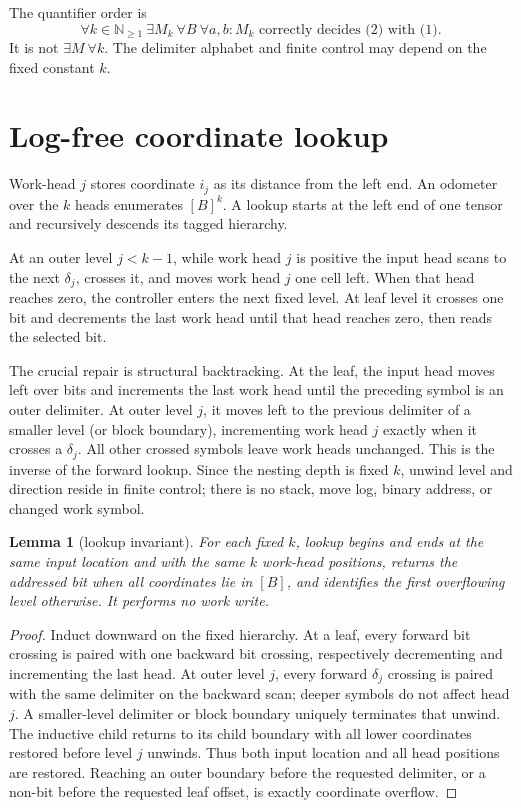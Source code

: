 \documentclass[11pt]{article}
\newtheorem{lemma}{Lemma}
\begin{document}
The quantifier order is
\[
 \forall k\in\mathbb N_{\ge1}\ \exists M_k\ \forall B\ \forall a,b:
 M_k\text{ correctly decides (2) with (1)}.           \tag{3}
\]
It is not $\exists M\ \forall k$.  The delimiter alphabet and finite control
may depend on the fixed constant $k$.

\section{Log-free coordinate lookup}
Work-head $j$ stores coordinate $i_j$ as its distance from the left end.  An
odometer over the $k$ heads enumerates $[B]^k$.  A lookup starts at the left
end of one tensor and recursively descends its tagged hierarchy.

At an outer level $j<k-1$, while work head $j$ is positive the input head
scans to the next $\delta_j$, crosses it, and moves work head $j$ one cell
left.  When that head reaches zero, the controller enters the next fixed
level.  At leaf level it crosses one bit and decrements the last work head
until that head reaches zero, then reads the selected bit.

The crucial repair is structural backtracking.  At the leaf, the input head
moves left over bits and increments the last work head until the preceding
symbol is an outer delimiter.  At outer level $j$, it moves left to the
previous delimiter of a smaller level (or block boundary), incrementing work
head $j$ exactly when it crosses a $\delta_j$.  All other crossed symbols
leave work heads unchanged.  This is the inverse of the forward lookup.
Since the nesting depth is fixed $k$, unwind level and direction reside in
finite control; there is no stack, move log, binary address, or changed work
symbol.

\begin{lemma}[lookup invariant]
For each fixed $k$, lookup begins and ends at the same input location and with
the same $k$ work-head positions, returns the addressed bit when all
coordinates lie in $[B]$, and identifies the first overflowing level
otherwise.  It performs no work write.
\end{lemma}
\begin{proof}
Induct downward on the fixed hierarchy.  At a leaf, every forward bit crossing
is paired with one backward bit crossing, respectively decrementing and
incrementing the last head.  At outer level $j$, every forward
$\delta_j$ crossing is paired with the same delimiter on the backward scan;
deeper symbols do not affect head $j$.  A smaller-level delimiter or block
boundary uniquely terminates that unwind.  The inductive child returns to its
child boundary with all lower coordinates restored before level $j$ unwinds.
Thus both input location and all head positions are restored.  Reaching an
outer boundary before the requested delimiter, or a non-bit before the
requested leaf offset, is exactly coordinate overflow.
\end{proof}
\end{document}
